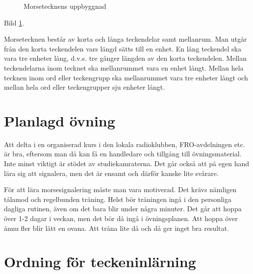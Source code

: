 \begin{figure}
  \caption{Morsetecknens uppbyggnad}
  \label{fig:bild_morse_1}
\end{figure}

Bild \ref{fig:bild_morse_1}.

Morsetecknen består av korta och långa teckendelar samt mellanrum. Man utgår från
den korta teckendelen vars längd sätts till en enhet. En lång teckendel ska
vara tre enheter lång, d.v.s. tre gånger längden av den korta
teckendelen. Mellan teckendelarna inom tecknet ska mellanrummet vara en enhet
långt. Mellan hela tecknen inom ord eller teckengrupp ska mellanrummet vara
tre enheter långt och mellan hela ord eller teckengrupper sju enheter långt.

\section{Planlagd övning}

Att delta i en organiserad kurs i den lokala radioklubben, FRO-avdelningen etc.
är bra, eftersom man då kan få en handledare och tillgång till övningsmaterial.
Inte minst viktigt är stödet av studiekamraterna.
Det går också att på egen hand lära sig att signalera, men det är ensamt och
därför kanske lite svårare.

För att lära morsesignalering måste man vara motiverad.
Det krävs nämligen tålamod och regelbunden träning.
Helst bör träningen ingå i den personliga dagliga rutinen,
även om det bara blir under några minuter.
Det går att hoppa över 1-2 dagar i veckan, men det bör då ingå i övningsplanen.
Att hoppa över ännu fler blir lätt en ovana.
Att träna lite då och då ger inget bra resultat.

\section{Ordning för teckeninlärning}

